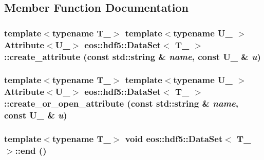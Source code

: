 \subsection{Member Function Documentation}
\hypertarget{classeos_1_1hdf5_1_1DataSet_a6004d70d8d014855457e4bb67f28e2ef}{
\subsubsection[{create\_\-attribute}]{\setlength{\rightskip}{0pt plus 5cm}template$<$typename T\_\-$>$ template$<$typename U\_\- $>$ {\bf Attribute}$<$U\_\-$>$ {\bf eos::hdf5::DataSet}$<$ T\_\- $>$::create\_\-attribute (const std::string \& {\em name}, \/  const U\_\- \& {\em u})}}
\label{classeos_1_1hdf5_1_1DataSet_a6004d70d8d014855457e4bb67f28e2ef}
\hypertarget{classeos_1_1hdf5_1_1DataSet_a98ac1430685d57b7de065aed4f6a874a}{
\subsubsection[{create\_\-or\_\-open\_\-attribute}]{\setlength{\rightskip}{0pt plus 5cm}template$<$typename T\_\-$>$ template$<$typename U\_\- $>$ {\bf Attribute}$<$U\_\-$>$ {\bf eos::hdf5::DataSet}$<$ T\_\- $>$::create\_\-or\_\-open\_\-attribute (const std::string \& {\em name}, \/  const U\_\- \& {\em u})}}
\label{classeos_1_1hdf5_1_1DataSet_a98ac1430685d57b7de065aed4f6a874a}
\hypertarget{classeos_1_1hdf5_1_1DataSet_a701084cc09483dc77579178d05b1aa35}{
\subsubsection[{end}]{\setlength{\rightskip}{0pt plus 5cm}template$<$typename T\_\-$>$ void {\bf eos::hdf5::DataSet}$<$ T\_\- $>$::end ()}}
\label{classeos_1_1hdf5_1_1DataSet_a701084cc09483dc77579178d05b1aa35}


